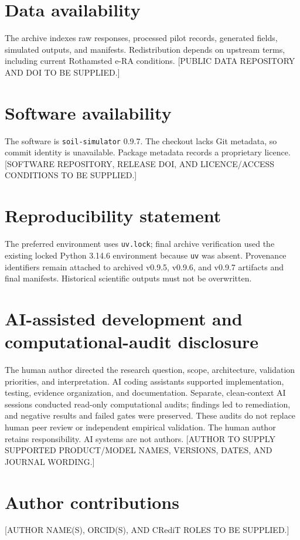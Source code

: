 \documentclass[11pt]{article}
\begin{document}
\section{Data availability}

The archive indexes raw responses, processed pilot records, generated fields, simulated outputs, and manifests. Redistribution depends on upstream terms, including current Rothamsted e-RA conditions. [PUBLIC DATA REPOSITORY AND DOI TO BE SUPPLIED.]

\section{Software availability}

The software is \texttt{soil-simulator} 0.9.7. The checkout lacks Git metadata, so commit identity is unavailable. Package metadata records a proprietary licence. [SOFTWARE REPOSITORY, RELEASE DOI, AND LICENCE/ACCESS CONDITIONS TO BE SUPPLIED.]

\section{Reproducibility statement}

The preferred environment uses \texttt{uv.lock}; final archive verification used the existing locked Python 3.14.6 environment because \texttt{uv} was absent. Provenance identifiers remain attached to archived v0.9.5, v0.9.6, and v0.9.7 artifacts and final manifests. Historical scientific outputs must not be overwritten.

\section{AI-assisted development and computational-audit disclosure}

The human author directed the research question, scope, architecture, validation priorities, and interpretation. AI coding assistants supported implementation, testing, evidence organization, and documentation. Separate, clean-context AI sessions conducted read-only computational audits; findings led to remediation, and negative results and failed gates were preserved. These audits do not replace human peer review or independent empirical validation. The human author retains responsibility. AI systems are not authors. [AUTHOR TO SUPPLY SUPPORTED PRODUCT/MODEL NAMES, VERSIONS, DATES, AND JOURNAL WORDING.]

\section{Author contributions}
[AUTHOR NAME(S), ORCID(S), AND CRediT ROLES TO BE SUPPLIED.]
\end{document}
